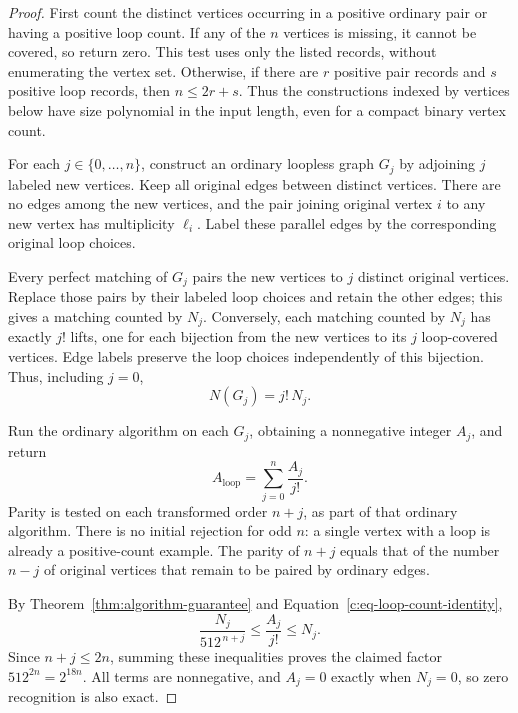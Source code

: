 \begin{proof}
First count the distinct vertices occurring in a positive ordinary pair
or having a positive loop count. If any of the \(n\) vertices is missing,
it cannot be covered, so return zero. This test uses only the listed
records, without enumerating the vertex set. Otherwise, if there are
\(r\) positive pair records and \(s\) positive loop records, then
\(n\le2r+s\). Thus the constructions indexed by vertices below have
size polynomial in the input length, even for a compact binary vertex
count.

For each \(j\in\{0,\ldots,n\}\), construct an ordinary loopless graph
\(G_j\) by adjoining \(j\) labeled new vertices.
Keep all original edges between distinct vertices.
There are no edges among the new vertices, and the pair joining
original vertex \(i\) to any new vertex has multiplicity \(\ell_i\).
Label these parallel edges by the corresponding original loop choices.

Every perfect matching of \(G_j\) pairs the new vertices to \(j\)
distinct original vertices.  Replace those pairs by their labeled
loop choices and retain the other edges; this gives a matching counted
by \(N_j\).
Conversely, each matching counted by \(N_j\) has exactly \(j!\) lifts,
one for each bijection from the new vertices to its \(j\) loop-covered
vertices.  Edge labels preserve the loop choices independently of this
bijection.  Thus, including \(j=0\),
\begin{equation}
\label{c:eq-loop-count-identity}
                         N(G_j)=j!\,N_j.
\end{equation}

Run the ordinary algorithm on each \(G_j\), obtaining a nonnegative
integer \(A_j\), and
return
\begin{equation}
\label{c:eq-loop-estimate}
                         A_{\mathrm{loop}}
                              =\sum_{j=0}^n\frac{A_j}{j!}.
\end{equation}
Parity is tested on each transformed order \(n+j\), as part of that
ordinary algorithm.  There is no initial rejection for odd \(n\):
a single vertex with a loop is already a positive-count example.
The parity of \(n+j\) equals that of the number \(n-j\) of original
vertices that remain to be paired by ordinary edges.

By Theorem~\ref{thm:algorithm-guarantee} and
Equation~\eqref{c:eq-loop-count-identity},
\[
             \frac{N_j}{512^{\,n+j}}
                   \le\frac{A_j}{j!}\le N_j.
\]
Since \(n+j\le2n\), summing these inequalities proves the claimed
factor \(512^{2n}=2^{18n}\).
All terms are nonnegative, and \(A_j=0\) exactly when \(N_j=0\), so
zero recognition is also exact.


\end{proof}
